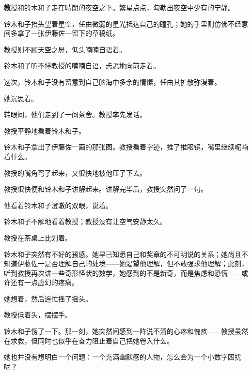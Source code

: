 
\AddSymbolsD
\pagecolor{Goldenrod!20!Gray}
\color{white}
\quad\quad \lettrine[,lraise=0.2,lhang=0.5]{\textbf{教}}{授}和铃木和子走在晴朗的夜空之下。繁星点点，勾勒出夜空中少有的宁静。

铃木和子抬头望着星空，任由微弱的星光抵达自己的瞳孔；她的手里则仿佛不经意间多拿了一张伊藤佐一留下的草稿纸。

教授则不顾天空之屏，低头喃喃自语着。


铃木和子听不懂教授的喃喃自语，忐忑地向前走着。


这次，铃木和子没有留意到自己脑海中多余的情愫，任由其扩散弥漫着。

她沉思着。

转眼间，他们走到了一间茶舍。教授率先发话。

教授平静地看着铃木和子。

铃木和子拿出了伊藤佐一画的那张图。教授看着字迹，推了推眼镜，嘴里继续呢喃着什么。

教授的嘴角弯了起来，又很快地被他压了下去。

教授很快便和铃木和子讲解起来。讲解完毕后，教授突然问了一句。

他看着铃木和子澄澈的双眼，说着。

铃木和子不解地看着教授；教授没有让空气安静太久。

教授在茶桌上比划着。

铃木和子突然有不好的预感。她早已知悉自己和奖章的不可明说的关系；她尚且不知道伊藤佐一是否理解自己的处境——她渴望他理解，但不敢强求他理解；此刻，听到教授再次讲一些奇形怪状的数学，她感到的不是新奇，而是焦虑和恐慌——或许还有一点虚幻的疼痛。


她想着，然后连忙摇了摇头。


教授低着头，摆摆手。

铃木和子愣了一下。那一刻，她突然间感到一阵说不清的心疼和愧疚——教授虽然在求救，但同时也似乎在奋力阻止着自己把她卷入什么。

她也并没有想明白一个问题：一个充满幽默感的人物，怎么会为一个小数字困扰呢？

